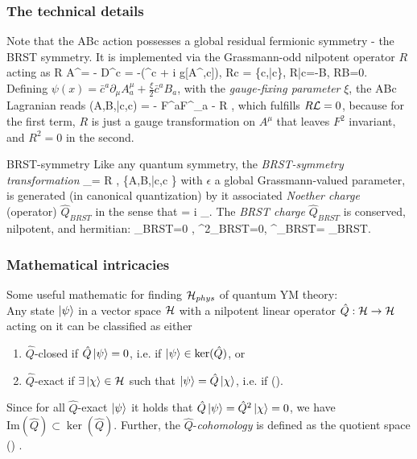 \subsubsection{The technical details}
Note that the ABc action  possesses a global residual fermionic symmetry - the BRST
symmetry. It is implemented via the Grassmann-odd nilpotent operator $R$ acting as
\be 
R A^\mu = - D^\mu c = -(\partial^\mu c + i g[A^\mu,c]), \; Rc =  \{c,\bar{c}\},\; R\bar{c}=-B, \; RB=0.
\ee 
Defining $\psi(x)= \bar{c}^a \partial_\mu A^\mu_a + \frac{\xi}{2} \bar{c}^aB_a$, with the \emph{gauge-fixing parameter} $\xi$, the ABc Lagranian reads
\be 
\mL(A,B,\bar{c},c) = -  F^a\munu F^{\mu \nu}_a - R \psi,
\ee 
which fulfills $R\mathcal{L}=0$, because for the first term, $R$ is just a gauge transformation on $A^\mu$ that leaves $F^2$ invariant, and $R^2=0$ in the second.\\
\begin{mybox}{BRST-symmetry}
	Like any quantum symmetry, the \emph{BRST-symmetry transformation}
	\be 
	\delta_\epsilon \Phi = \epsilon R \Phi, \quad \Phi \in \{A,B,\bar{c},c \}
	\ee 
	with $\epsilon$ a global Grassmann-valued parameter, is generated (in canonical quantization) by it associated \emph{Noether charge} (operator) $\hat{Q}_{BRST}$ in the sense that
	= i \delta_\epsilon \hat{\Phi}.
	\ee 
	The \emph{BRST charge} $\hat{Q}_{BRST}$ is conserved, nilpotent, and hermitian:
	\be 
	_{BRST}=0  ,\; ^2_{BRST}=0, \; ^\dagger_{BRST}= _{BRST}.
	\ee 
\end{mybox}
\subsubsection{Mathematical intricacies}
Some useful mathematic for finding $\mathcal{H}_{phys}$ of quantum YM theory:\\
Any state $\ket{\psi}$ in a vector space $\mathcal{H}$ with a nilpotent linear operator $\hat{Q}: \mathcal{H} \rightarrow \mathcal{H}$ acting on it can be classified as either
\begin{enumerate}
	\item $\hat{Q}$-closed if $\hat{Q}\ket{\psi} =0$, i.e. if $\ket{\psi}\in \ker(\hat{Q})$, or
	\item $\hat{Q}$-exact if $\exists \ket{\chi} \in \mathcal{H}$ such that $\ket{\psi} = \hat{Q}\ket{\chi}$, i.e. if 
	\bse 
	\ket{\psi} \in {}().
	\ese 
\end{enumerate}
Since for all $\hat{Q}$-exact $\ket{\psi}$ it holds that $\hat{Q}\ket{\psi}=\hat{Q}^2\ket{\chi}=0$, we have $\text{Im}(\hat{Q}) \subset \ker(\hat{Q})$. Further, the 
$\hat{Q}$-\emph{cohomology} is defined as the quotient space
\be 
{}() \equiv {}.
\ee 
